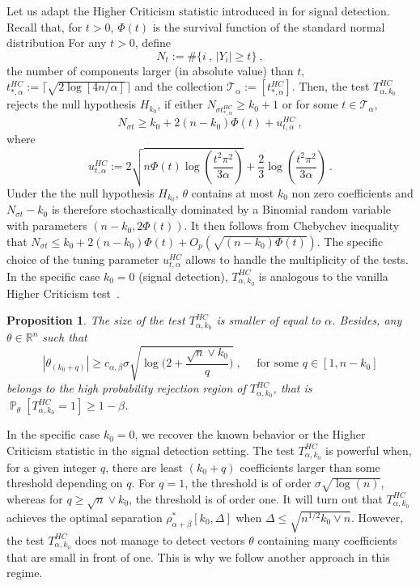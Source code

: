 \documentclass[twoside,11pt]{article}
\newtheorem{prp}{Proposition}
\def\beq{\begin{equation}}
\def\eeq{\end{equation}}
\def\cT{\mathcal{T}}
\renewcommand{\P}{\operatorname{\mathbb{P}}}
\newcommand{\<}{\langle}
\renewcommand{\>}{\rangle}
\begin{document}
Let us adapt the Higher Criticism statistic introduced in \cite{jin2004} for signal detection. Recall that, for $t>0$, $\Phi(t)$ is the survival function of the standard normal distribution For any $t>0$, define 
\beq\label{eq:definition_Nt}
N_t := \#\{i\ ,\, |Y_i|\geq t\}\ ,
\eeq
the number of components larger (in absolute value) than $t$, 
  $t^{HC}_{*,\alpha}:= \lceil \sqrt{2\log[4n/\alpha]}\rceil $ and the collection $\cT_{\alpha}:=[ t^{HC}_{*,\alpha}]$. Then, the test $T^{HC}_{\alpha,k_0}$ rejects the null hypothesis $H_{k_0}$, if either $N_{\sigma t^{HC}_{*,\alpha}}\geq k_0+1$ or for some $t\in \cT_{\alpha}$, 
\beq \label{eq:definition_rejection_HC}
N_{\sigma t}\geq  k_0 +2(n-k_0)\Phi(t)+ u^{HC}_{t,\alpha}\ ,
\eeq
where 
\beq\label{eq:rejection_Nt}
   u^{HC}_{t,\alpha} := 2\sqrt{n\Phi(t)\log\left(\frac{t^2\pi^2}{3\alpha}\right)} + \frac{2}{3}\log\left(\frac{t^2\pi^2}{3\alpha}\right)\ . 
\eeq
Under the the null hypothesis $H_{k_0}$, $\theta$ contains at most $k_0$ non zero coefficients and $N_{\sigma t}-k_0$ is therefore stochastically dominated by a Binomial random variable with parameters $(n-k_0, 2\Phi(t))$. It then follows from Chebychev inequality that $N_{\sigma t}\leq k_0 + 2(n-k_0)\Phi(t)+ O_p(\sqrt{(n-k_0)\Phi(t)})$. 
The specific choice of the tuning parameter $u^{HC}_{t,\alpha}$ allows to handle the multiplicity of the tests. In the specific case $k_0=0$ (signal detection), $T^{HC}_{\alpha,k_0}$
is analogous to the vanilla Higher Criticism test~\cite{jin2004}. 



\begin{prp}\label{cor:T_HC} 
The size of the test $T^{HC}_{\alpha,k_0}$ is smaller of equal to $\alpha$. Besides, any $\theta\in \mathbb{R}^n$ such that 
 \beq\label{eq:separation_simple_HC}
 |\theta_{(k_0+q)}| \geq c_{\alpha,\beta}\sigma \sqrt{\log\Big(2+ \frac{\sqrt{n}\vee k_0}{q}\Big)}\ , \quad \text{ for some  }q\in [1,n-k_0]
 \eeq
 belongs to the high probability rejection region of $T^{HC}_{\alpha,k_0}$, that is $\P_{\theta}[T^{HC}_{\alpha,k_0}=1]\geq 1-\beta$.
 \end{prp}
In the specific case $k_0=0$, we recover the known behavior or the Higher Criticism statistic in the signal detection setting. The test $T^{HC}_{\alpha,k_0}$ is powerful when, for a given integer $q$, there are least $(k_0+q)$ coefficients  larger than some threshold depending on $q$. For $q=1$, the threshold is of order $\sigma \sqrt{\log(n)}$, whereas for $q\geq \sqrt{n}\vee k_0$, the threshold is of order one. It will turn out that $T^{HC}_{\alpha,k_0}$ achieves the optimal separation $\rho^{*}_{\alpha+\beta}[k_0,\Delta]$ when $\Delta\leq \sqrt{n^{1/2}k_0 \vee n}$. However, the test $T^{HC}_{\alpha,k_0}$ does not manage to detect vectors $\theta$ containing many coefficients that are small in front of one. This is why we follow another approach in this regime. 
\end{document}

